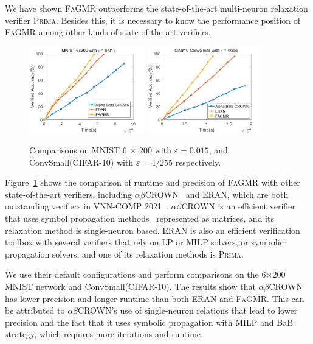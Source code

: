 \documentclass[runningheads]{llncs}
\newcommand{\ourtool}{\textsc{FaGMR}\xspace}
\newcommand{\prima}{\textsc{Prima}\xspace}
\newcommand{\mnist}{MNIST\xspace}
\newcommand{\cifar}{CIFAR-10\xspace}
\newcommand{\eran}{\textsc{ERAN}\xspace}
\newcommand{\abcrown}{\textsc{$\alpha$$\beta$CROWN}\xspace}
\begin{document}
We have shown \ourtool outperforms the state-of-the-art multi-neuron relaxation verifier \prima.
Besides this, it is necessary to know the performance position of \ourtool among other
kinds of state-of-the-art verifiers.
\begin{figure}  
\begin{center}
\includegraphics[width=5cm]{figures/state_6x200_0.015_mnist}
\includegraphics[width=5cm]{figures/state_convsmall_4255_cifar10.png}  
\caption{Comparisons on \mnist 6 $\times$ 200 with $\varepsilon=0.015$, 
and ConvSmall(\cifar) with $\varepsilon=4/255$ respectively.}
\label{comparison}
\end{center}
\end{figure}
Figure~\ref{comparison} shows the comparison of runtime and precision of \ourtool with other state-of-the-art verifiers, including \abcrown~\cite{DBLP:conf/iclr/XuZ0WJLH21} and \eran, which are both outstanding verifiers in VNN-COMP 2021~\cite{DBLP:journals/corr/abs-2109-00498}. \abcrown is an efficient verifier that uses symbol propagation methods~\cite{DBLP:conf/nips/ZhangWCHD18} represented as matrices, and its relaxation method is single-neuron based. \eran is also an efficient verification toolbox with several verifiers that rely on LP or MILP solvers, or symbolic propagation solvers, and one of its relaxation methods is \prima.

We use their default configurations and perform comparisons on the 6$\times$200 \mnist network and ConvSmall(\cifar). The results show that \abcrown has lower precision and longer runtime than both \eran and \ourtool. This can be attributed to \abcrown's use of single-neuron relations that lead to lower precision and the fact that it uses symbolic propagation with MILP and BaB strategy, which requires more iterations and runtime. 
\end{document}
